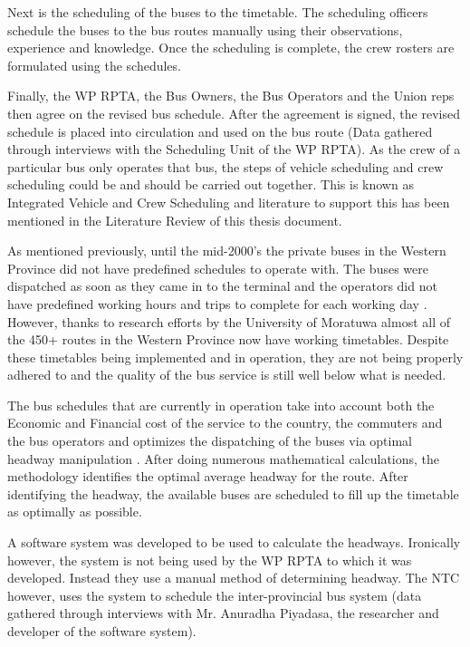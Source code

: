 \documentclass[12pt, oneside]{report}
\begin{document}
Next is the scheduling of the buses to the timetable. The scheduling officers schedule the buses to the bus routes manually using their observations, experience and knowledge. Once the scheduling is complete, the crew rosters are formulated using the schedules. 

Finally, the WP RPTA, the Bus Owners, the Bus Operators and the Union reps then agree on the revised bus schedule. After the agreement is signed, the revised schedule is placed into circulation and used on the bus route (Data gathered through interviews with the Scheduling Unit of the WP RPTA).
As the crew of a particular bus only operates that bus, the steps of vehicle scheduling and crew scheduling could be and should be carried out together. This is known as Integrated Vehicle and Crew Scheduling and literature to support this has been mentioned in the Literature Review of this thesis document.

As mentioned previously, until the mid-2000’s the private buses in the Western Province did not have predefined schedules to operate with. The buses were dispatched as soon as they came in to the terminal and the operators did not have predefined working hours and trips to complete for each working day \citep{Piyadasa2005}. However, thanks to research efforts by the University of Moratuwa almost all of the 450+ routes in the Western Province now have working timetables. Despite these timetables being implemented and in operation, they are not being properly adhered to and the quality of the bus service is still well below what is needed.

The bus schedules that are currently in operation take into account both the Economic and Financial cost of the service to the country, the commuters and the bus operators and optimizes the dispatching of the buses via optimal headway manipulation \citep{Piyadasa2005}. After doing numerous mathematical calculations, the methodology identifies the optimal average headway for the route. After identifying the headway, the available buses are scheduled to fill up the timetable as optimally as possible.

A software system was developed to be used to calculate the headways. Ironically however, the system is not being used by the WP RPTA to which it was developed. Instead they use a manual method of determining headway. The NTC however, uses the system to schedule the inter-provincial bus system (data gathered through interviews with Mr. Anuradha Piyadasa, the researcher and developer of the software system).
\end{document}
